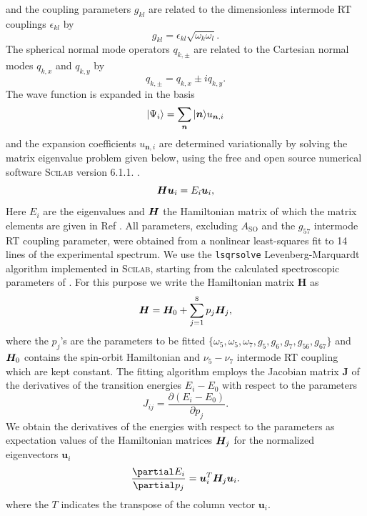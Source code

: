 and the coupling parameters $g_{kl}$ are related to the dimensionless
intermode RT couplings $\epsilon_{kl}$ by
\begin{equation}
      g_{kl}=\epsilon_{kl}\sqrt{\omega_k\omega_l}.
\end{equation}
The spherical normal mode operators $q_{k,\pm}$ are related to the
Cartesian normal modes $q_{k,x}$ and $q_{k,y}$ by
\begin{equation}
  q_{k,\pm} = q_{k,x} \pm i q_{k,y}.
\end{equation}
The wave function is expanded in the basis
\begin{equation}
    | \Psi_i \rangle = \sum_{\bm n} | \bm n \rangle u_{{\bm n}, i}
\end{equation}
and the expansion coefficients $u_{{\bm n}, i}$ are determined variationally by solving the matrix eigenvalue problem given below, using the free and open source numerical software {\textsc{Scilab}} version 6.1.1. \cite{SCILAB}.
\begin{equation}
\label{eq:eigval}
    \bm H {\bm u}_i = E_i {\bm u}_i,
\end{equation}
Here $E_i$ are the eigenvalues and $\bm H$ the Hamiltonian matrix of which the matrix elements are given in Ref  \cite{He2005}.
All parameters, excluding $A_\mathrm{SO}$ and the $g_{57}$ intermode RT coupling parameter, were obtained from a nonlinear least-squares fit to 14 lines of the experimental spectrum. We use the \verb+lsqrsolve+ Levenberg-Marquardt algorithm implemented in {\textsc{Scilab}}, starting from the calculated spectroscopic parameters of \citet{Dai2015TheCalculations}. For this purpose we write
the Hamiltonian matrix ${\bm H}$ as
\begin{equation}
  \bm H = \bm H_0 + \sum_{j=1}^{8} p_j \bm H_j,
\end{equation}
where the $p_j$'s are the parameters to be fitted $\{\omega_5, \omega_5, \omega_7, g_5, g_6, g_7, g_{56}, g_{67}\}$ and $\bm H_0$ contains the spin-orbit Hamiltonian and $\nu_5-\nu_7$ intermode RT coupling which are kept constant.
The fitting algorithm employs the Jacobian matrix ${\bm J}$ of the derivatives
of the transition energies $E_i-E_0$ with respect to the parameters
\begin{equation}
  J_{ij} = \frac{\partial (E_i-E_0)}{\partial p_j}.
\end{equation}
We obtain the derivatives of the energies with respect to the parameters as expectation values of the Hamiltonian matrices $\bm H_j$ for the
normalized eigenvectors ${\bm u}_i$
\begin{equation}
  \frac{\partial E_i}{\partial p_j} = {\bm u}_i^T \bmH_j{\bm u}_i.
\end{equation}
where the $T$ indicates the transpose of the column vector ${\bm u}_i$.

